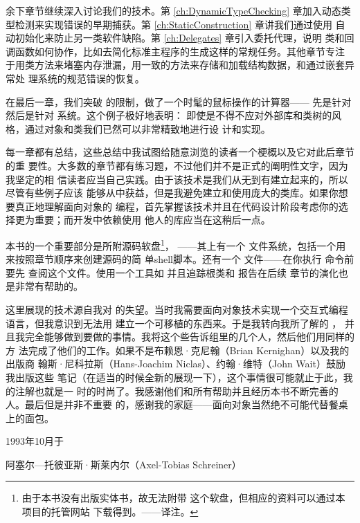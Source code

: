 余下章节继续深入讨论我们的技术。第 \ref{ch:DynamicTypeChecking} 章加入动态类
型检测来实现错误的早期捕获。第 \ref{ch:StaticConstruction} 章讲我们通过使用
自动初始化来防止另一类软件缺陷。第 \ref{ch:Delegates} 章引入委托代理，说明
类和回调函数如何协作，比如去简化标准主程序的生成这样的常规任务。其他章节专注
于用类方法来堵塞内存泄漏，用一致的方法来存储和加载结构数据，和通过嵌套异常处
理系统的规范错误的恢复。

在最后一章，我们突破 的限制，做了一个时髦的鼠标操作的计算器——
先是针对 然后是针对 系统。这个例子极好地表明：
即使是不得不应对外部库和类树的风格，通过对象和类我们已然可以非常精致地进行设
计和实现。

每一章都有总结，这些总结中我试图给随意浏览的读者一个梗概以及它对此后章节的重
要性。大多数的章节都有练习题，不过他们并不是正式的阐明性文字，因为我坚定的相
信读者应当自己实践。由于该技术是我们从无到有建立起来的，所以尽管有些例子应该
能够从中获益，但是我避免建立和使用庞大的类库。如果你想要真正地理解面向对象的
编程，首先掌握该技术并且在代码设计阶段考虑你的选择更为重要；而开发中依赖使用
他人的库应当在这稍后一点。

本书的一个重要部分是所附源码软盘\footnote{由于本书没有出版实体书，故无法附带
这个软盘，但相应的资料可以通过本项目的托管网站
下载得到。\hfill ——译注。}，
——其上有一个 文件系统，包括一个用来按照章节顺序来创建源码的简
单shell脚本。还有一个 文件——在你执行 命令前要先
查阅这个文件。使用一个工具如 并且追踪根类和 报告在后续
章节的演化也是非常有帮助的。

这里展现的技术源自我对 \cpp 的失望。当时我需要面向对象技术实现一个交互式编程
语言，但我意识到无法用 \cpp 建立一个可移植的东西来。于是我转向我所了解的
，
并且我完全能够做到要做的事情。我将这个些告诉组里的几个人，然后他们用同样的方
法完成了他们的工作。如果不是布赖恩·克尼翰（Brian Kernighan）以及我的出版商
翰斯·尼科拉斯（Hans-Joachim Niclas）、约翰·维特（John Wait）鼓励我出版这些
笔记（在适当的时候全新的展现一下），这个事情很可能就止于此，我的注解也就是一
时的时尚了。我感谢他们和所有帮助并且经历本书不断完善的人。最后但是并非不重要
的，感谢我的家庭——面向对象当然绝不可能代替餐桌上的面包。 

\bigskip
\bigskip

\begin{flushright}
	1993年10月于

	阿塞尔—托彼亚斯·斯莱内尔（Axel-Tobias Schreiner）
\end{flushright}


